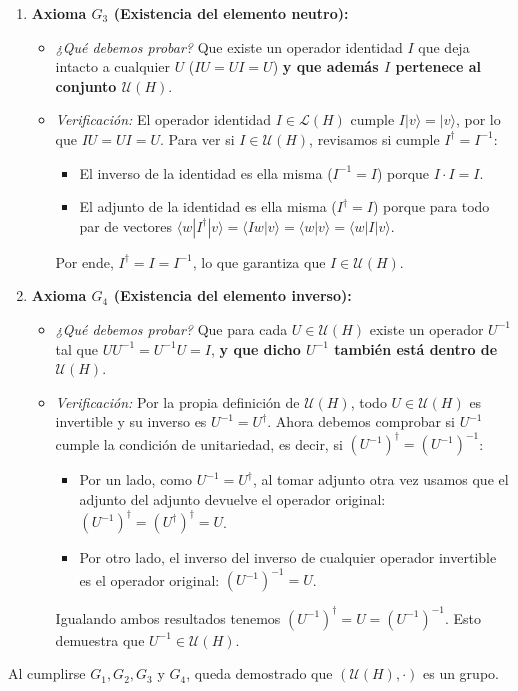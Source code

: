 \documentclass[11pt, a4paper]{article}
\begin{document}
\begin{enumerate}
    \item \textbf{Axioma $G_3$ (Existencia del elemento neutro):}
    \begin{itemize}
        \item \textit{¿Qué debemos probar?} Que existe un operador identidad $I$ que deja intacto a cualquier $U$ ($I U = U I = U$) \textbf{y que además $I$ pertenece al conjunto $\mathcal{U}(H)$}.
        \item \textit{Verificación:} El operador identidad $I \in \mathcal{L}(H)$ cumple $I|v\rangle = |v\rangle$, por lo que $I U = U I = U$. Para ver si $I \in \mathcal{U}(H)$, revisamos si cumple $I^\dagger = I^{-1}$:
        \begin{itemize}
            \item El inverso de la identidad es ella misma ($I^{-1} = I$) porque $I \cdot I = I$.
            \item El adjunto de la identidad es ella misma ($I^\dagger = I$) porque para todo par de vectores $\langle w | I^\dagger | v \rangle = \langle I w | v \rangle = \langle w | v \rangle = \langle w | I | v \rangle$.
        \end{itemize}
        Por ende, $I^\dagger = I = I^{-1}$, lo que garantiza que $I \in \mathcal{U}(H)$.
    \end{itemize}

    \item \textbf{Axioma $G_4$ (Existencia del elemento inverso):}
    \begin{itemize}
        \item \textit{¿Qué debemos probar?} Que para cada $U \in \mathcal{U}(H)$ existe un operador $U^{-1}$ tal que $U U^{-1} = U^{-1} U = I$, \textbf{y que dicho $U^{-1}$ también está dentro de $\mathcal{U}(H)$}.
        \item \textit{Verificación:} Por la propia definición de $\mathcal{U}(H)$, todo $U \in \mathcal{U}(H)$ es invertible y su inverso es $U^{-1} = U^\dagger$. Ahora debemos comprobar si $U^{-1}$ cumple la condición de unitariedad, es decir, si $(U^{-1})^\dagger = (U^{-1})^{-1}$:
        \begin{itemize}
            \item Por un lado, como $U^{-1} = U^\dagger$, al tomar adjunto otra vez usamos que el adjunto del adjunto devuelve el operador original: $(U^{-1})^\dagger = (U^\dagger)^\dagger = U$.
            \item Por otro lado, el inverso del inverso de cualquier operador invertible es el operador original: $(U^{-1})^{-1} = U$.
        \end{itemize}
        Igualando ambos resultados tenemos $(U^{-1})^\dagger = U = (U^{-1})^{-1}$. Esto demuestra que $U^{-1} \in \mathcal{U}(H)$.
    \end{itemize}
\end{enumerate}
Al cumplirse $G_1, G_2, G_3$ y $G_4$, queda demostrado que $(\mathcal{U}(H), \cdot)$ es un grupo.
\end{document}

